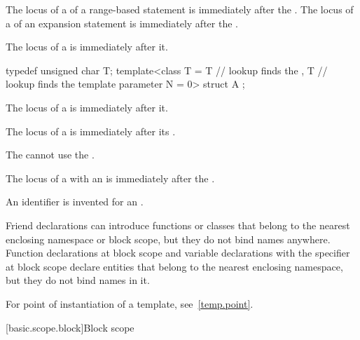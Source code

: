 \pnum
The locus of a 
of a range-based  statement
is immediately after the .
The locus of a 
of an expansion statement
is immediately after the .

\pnum
The locus of a  is immediately after it.
\begin{example}
\begin{codeblock}
typedef unsigned char T;
template<class T
  = T               // lookup finds the 
  , T               // lookup finds the template parameter
    N = 0> struct A { };
\end{codeblock}
\end{example}

\pnum
The locus of a 
is immediately after it.

\pnum
The locus of a 
is immediately after its .
\begin{note}
The  cannot use
the .
\end{note}

\pnum
The locus of a 
with an 
is immediately after the .
\begin{note}
An identifier is invented
for an .
\end{note}

\pnum
\begin{note}
Friend declarations can introduce functions or classes
that belong to the nearest enclosing namespace or block scope,
but they do not bind names anywhere.
Function declarations at block scope and
variable declarations with the  specifier at block scope
declare entities
that belong to the nearest enclosing namespace,
but they do not bind names in it.
\end{note}

\pnum
\begin{note}
For point of instantiation of a template, see~\ref{temp.point}.
\end{note}

[basic.scope.block]{Block scope}

